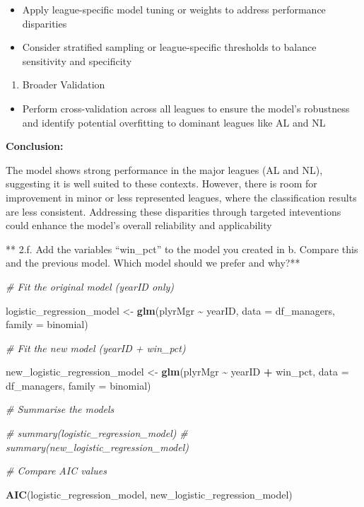 \documentclass[
]{article}
\newenvironment{Shaded}{\begin{snugshade}}{\end{snugshade}}
\newcommand{\AttributeTok}[1]{\textcolor[rgb]{0.13,0.29,0.53}{#1}}
\newcommand{\CommentTok}[1]{\textcolor[rgb]{0.56,0.35,0.01}{\textit{#1}}}
\newcommand{\FunctionTok}[1]{\textcolor[rgb]{0.13,0.29,0.53}{\textbf{#1}}}
\newcommand{\NormalTok}[1]{#1}
\newcommand{\OtherTok}[1]{\textcolor[rgb]{0.56,0.35,0.01}{#1}}
\newcommand{\SpecialCharTok}[1]{\textcolor[rgb]{0.81,0.36,0.00}{\textbf{#1}}}
\providecommand{\tightlist}{%
  \setlength{\itemsep}{0pt}\setlength{\parskip}{0pt}}
\begin{document}
\begin{itemize}
\item
  Apply league-specific model tuning or weights to address performance
  disparities
\item
  Consider stratified sampling or league-specific thresholds to balance
  sensitivity and specificity
\end{itemize}

\begin{enumerate}
\def\labelenumi{\arabic{enumi}.}
\setcounter{enumi}{2}
\tightlist
\item
  Broader Validation
\end{enumerate}

\begin{itemize}
\tightlist
\item
  Perform cross-validation across all leagues to ensure the model's
  robustness and identify potential overfitting to dominant leagues like
  AL and NL
\end{itemize}

\textbf{Conclusion:}

The model shows strong performance in the major leagues (AL and NL),
suggesting it is well suited to these contexts. However, there is room
for improvement in minor or less represented leagues, where the
classification results are less consistent. Addressing these disparities
through targeted inteventions could enhance the model's overall
reliability and applicability

** 2.f. Add the variables ``win\_pct'' to the model you created in b.
Compare this and the previous model. Which model should we prefer and
why?**

\begin{Shaded}
\begin{Highlighting}[]
\CommentTok{\# Fit the original model (yearID only)}

\NormalTok{logistic\_regression\_model }\OtherTok{\textless{}{-}} \FunctionTok{glm}\NormalTok{(plyrMgr }\SpecialCharTok{\textasciitilde{}}\NormalTok{ yearID, }\AttributeTok{data =}\NormalTok{ df\_managers, }\AttributeTok{family =}\NormalTok{ binomial)}

\CommentTok{\# Fit the new model (yearID + win\_pct)}

\NormalTok{new\_logistic\_regression\_model }\OtherTok{\textless{}{-}} \FunctionTok{glm}\NormalTok{(plyrMgr }\SpecialCharTok{\textasciitilde{}}\NormalTok{ yearID }\SpecialCharTok{+}\NormalTok{ win\_pct, }\AttributeTok{data =}\NormalTok{ df\_managers, }\AttributeTok{family =}\NormalTok{ binomial)}

\CommentTok{\# Summarise the models}

\CommentTok{\# summary(logistic\_regression\_model)}
\CommentTok{\# summary(new\_logistic\_regression\_model)}

\CommentTok{\# Compare AIC values}

\FunctionTok{AIC}\NormalTok{(logistic\_regression\_model, new\_logistic\_regression\_model)}
\end{Highlighting}
\end{Shaded}
\end{document}
